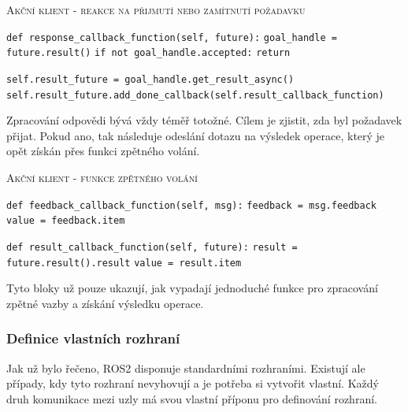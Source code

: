 \begin{algorithm}[h!]
	\label{}
	\caption{\textsc{Akční klient - reakce na přijmutí nebo zamítnutí požadavku}}
	
	\DontPrintSemicolon
	\SetAlgoNoLine
	\SetNlSty{}{}{:}
	\SetNlSkip{-1.1em}
	
	\BlankLine \Indp\Indpp
	
	\texttt{def response\_callback\_function(self, future):}\;
	\Indp\Indp
	\texttt{goal\_handle = future.result()}\;
	\texttt{if not goal\_handle.accepted:}\;
	\Indp\Indp
	\texttt{return}\;
	\Indm\Indm
	
	\BlankLine
	\texttt{self.result\_future = goal\_handle.get\_result\_async()}\;
	\texttt{self.result\_future.add\_done\_callback(self.result\_callback\_function)}\;
	\Indm\Indm
	
\end{algorithm}
Zpracování odpovědi bývá vždy téměř totožné. Cílem je zjistit, zda byl požadavek přijat. Pokud ano, tak následuje odeslání dotazu na výsledek operace, který je opět získán přes funkci zpětného volání. \cite{ros2_documentation}

\begin{algorithm}[h!]
	\label{}
	\caption{\textsc{Akční klient - funkce zpětného volání}}
	
	\DontPrintSemicolon
	\SetAlgoNoLine
	\SetAlgoNlRelativeSize{-1}
	\SetNlSty{}{}{:}
	\SetNlSkip{-1.1em}
	
	\BlankLine \Indp\Indpp
	
	\BlankLine
	\texttt{def feedback\_callback\_function(self, msg):}\;
	\Indp\Indp
	\texttt{feedback = msg.feedback}\;
	\texttt{value = feedback.item}\;
	\Indm\Indm
	
	\BlankLine
	\texttt{def result\_callback\_function(self, future):}\;
	\Indp\Indp
	\texttt{result = future.result().result}\;
	\texttt{value = result.item}\;

\end{algorithm}
Tyto bloky už pouze ukazují, jak vypadají jednoduché funkce pro zpracování zpětné vazby a získání výsledku operace.

\subsubsection*{Definice vlastních rozhraní} \label{theory:custom_interfaces}
Jak už bylo řečeno, ROS2 disponuje standardními rozhraními. Existují ale případy, kdy tyto rozhraní nevyhovují a je potřeba si vytvořit vlastní. Každý druh komunikace mezi uzly má svou vlastní příponu pro definování rozhraní. \cite{ros2_introduction}

